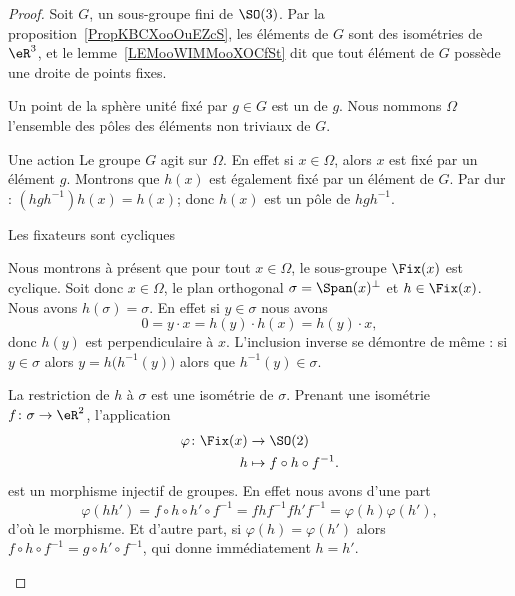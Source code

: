 \begin{proof}
    Soit \( G\), un sous-groupe fini de \( \SO(3)\). Par la proposition~\ref{PropKBCXooOuEZcS}, les éléments de \( G\) sont des isométries de \( \eR^3\), et le lemme~\ref{LEMooWIMMooXOCfSt} dit que tout élément de \( G\) possède une droite de points fixes.

    Un point de la sphère unité fixé par \( g\in G\) est un  de \( g\). Nous nommons \( \Omega\) l'ensemble des pôles des éléments non triviaux de \( G\).
    \begin{subproof}
        \item[Une action]
            Le groupe \( G\) agit sur \( \Omega\). En effet si \( x\in \Omega\), alors \( x\) est fixé par un élément \( g\). Montrons que \( h(x)\) est également fixé par un élément de \( G\). Par dur : \( (hgh^{-1})h(x)=h(x)\); donc \( h(x)\) est un pôle de \( h gh^{-1}\).

        \item[Les fixateurs sont cycliques]

            Nous montrons à présent que pour tout \( x\in\Omega\), le sous-groupe \( \Fix(x)\) est cyclique. Soit donc \( x\in\Omega\), le plan orthogonal \( \sigma=\Span(x)^{\perp}\) et \( h\in \Fix(x)\). Nous avons \( h(\sigma)=\sigma\). En effet si \( y\in \sigma\) nous avons
            \begin{equation}
                0=y\cdot x=h(y)\cdot h(x)=h(y)\cdot x,
            \end{equation}
            donc \( h(y)\) est perpendiculaire à \( x\). L'inclusion inverse se démontre de même : si \( y\in \sigma\) alors \( y=h\big( h^{-1}(y) \big)\) alors que \( h^{-1}(y)\in \sigma\).

            La restriction de \( h\) à \( \sigma\) est une isométrie de \( \sigma\). Prenant une isométrie \( f\colon \sigma\to \eR^2\), l'application
            \begin{equation}
                \begin{aligned}
                    \varphi\colon \Fix(x)&\to \SO(2) \\
                    h&\mapsto f\circ h\circ f^{-1}.
                \end{aligned}
            \end{equation}
            est un morphisme injectif de groupes. En effet nous avons d'une part
            \begin{equation}
                \varphi(hh')=f\circ h\circ h'\circ f^{-1}=fhf^{-1}fh'f^{-1}=\varphi(h)\varphi(h'),
            \end{equation}
            d'où le morphisme. Et d'autre part, si \( \varphi(h)=\varphi(h')\) alors \( f\circ h\circ f^{-1}=g\circ h'\circ f^{-1}\), qui donne immédiatement \( h=h'\).


\end{subproof}
\end{proof}
